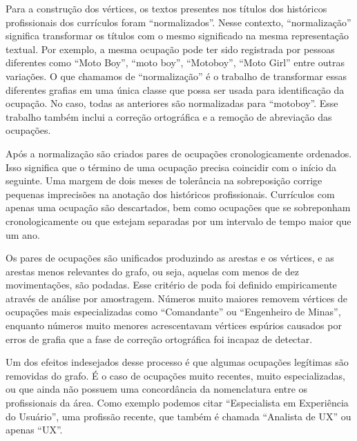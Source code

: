 \documentclass[12pt,a4paper,final]{article}
\begin{document}
Para a construção dos vértices, os textos presentes nos títulos dos históricos profissionais dos currículos foram \enquote{normalizados}. Nesse contexto, \enquote{normalização} significa transformar os títulos com o mesmo significado na mesma representação textual. Por exemplo, a mesma ocupação pode ter sido registrada por pessoas diferentes como \enquote{Moto Boy}, \enquote{moto boy}, \enquote{Motoboy}, \enquote{Moto Girl} entre outras variações. O que chamamos de \enquote{normalização} é o trabalho de transformar essas diferentes grafias em uma única classe que possa ser usada para identificação da ocupação. No caso, todas as anteriores são normalizadas para \enquote{motoboy}. Esse trabalho também inclui a correção ortográfica e a remoção de abreviação das ocupações.

Após a normalização são criados pares de ocupações cronologicamente ordenados. Isso significa que o término de uma ocupação precisa coincidir com o início da seguinte. Uma margem de dois meses de tolerância na sobreposição corrige pequenas imprecisões na anotação dos históricos profissionais. Currículos com apenas uma ocupação são descartados, bem como ocupações que se sobreponham cronologicamente ou que estejam separadas por um intervalo de tempo maior que um ano.

Os pares de ocupações são unificados produzindo as arestas e os vértices, e as arestas menos relevantes do grafo, ou seja, aquelas com menos de dez movimentações, são podadas. Esse critério de poda foi definido empiricamente através de análise por amostragem. Números muito maiores removem vértices de ocupações mais especializadas como \enquote{Comandante} ou \enquote{Engenheiro de Minas}, enquanto números muito menores acrescentavam vértices espúrios causados por erros de grafia que a fase de correção ortográfica foi incapaz de detectar.

Um dos efeitos indesejados desse processo é que algumas ocupações legítimas são removidas do grafo. É o caso de ocupações muito recentes, muito especializadas, ou que ainda não possuem uma concordância da nomenclatura entre os profissionais da área. Como exemplo podemos citar \enquote{Especialista em Experiência do Usuário}, uma profissão recente, que também é chamada \enquote{Analista de UX} ou apenas \enquote{UX}.

\end{document}
